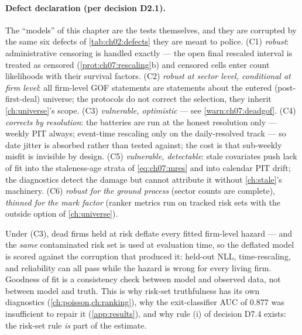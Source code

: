 \paragraph{Defect declaration (per decision D2.1).}
The ``models'' of this chapter are the tests themselves, and they are
corrupted by the same six defects of \cref{tab:ch02:defects} they are
meant to police. (C1) \emph{robust}: administrative censoring is handled
exactly --- the open final rescaled interval is treated as censored
(\cref{prot:ch07:rescaling}b) and censored cells enter count likelihoods
with their survival factors. (C2) \emph{robust at sector level,
conditional at firm level}: all firm-level GOF statements are statements
about the entered (post-first-deal) universe; the protocols do not
correct the selection, they inherit \cref{ch:universe}'s scope. (C3)
\emph{vulnerable, optimistic} --- see \cref{warn:ch07:deadgof}. (C4)
\emph{corrects by resolution}: the batteries are run at the honest
resolution only --- weekly PIT always; event-time rescaling only on the
daily-resolved track --- so date jitter is absorbed rather than tested
against; the cost is that sub-weekly misfit is invisible by design. (C5)
\emph{vulnerable, detectable}: stale covariates push lack of fit into the
staleness-age strata of \cref{eq:ch07:mres} and into calendar PIT drift;
the diagnostics detect the damage but cannot attribute it without
\cref{ch:stale}'s machinery. (C6) \emph{robust for the ground process}
(sector counts are complete), \emph{thinned for the mark factor} (ranker
metrics run on tracked risk sets with the outside option of
\cref{ch:universe}).

\begin{warning}\label{warn:ch07:deadgof}
Under (C3), dead firms held at risk deflate every fitted firm-level
hazard --- and the \emph{same} contaminated risk set is used at
evaluation time, so the deflated model is scored against the corruption
that produced it: held-out NLL, time-rescaling, and reliability can all
pass while the hazard is wrong for every living firm. Goodness of fit is
a consistency check between model and observed data, not between model
and truth. This is why risk-set truthfulness has its own diagnostics
(\cref{ch:poisson,ch:ranking}), why the exit-classifier AUC of $0.877$
was insufficient to repair it (\cref{app:results}), and why rule (i) of
decision D7.4 exists: the risk-set rule \emph{is} part of the estimate.
\end{warning}

